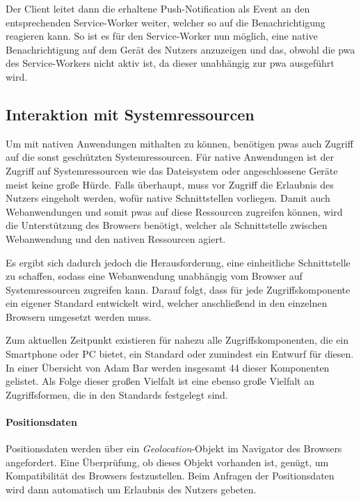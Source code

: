 \documentclass[12pt, parskip=half]{scrartcl}       %
\begin{document}

Der Client leitet dann die erhaltene Push-Notification als Event an den entsprechenden Service-Worker weiter, welcher so auf die Benachrichtigung reagieren kann.
So ist es für den Service-Worker nun möglich, eine native Benachrichtigung auf dem Gerät des Nutzers anzuzeigen und das, obwohl die \ac{pwa} des Service-Workers nicht aktiv ist, da dieser unabhängig zur \ac{pwa} ausgeführt wird.


\subsection{Interaktion mit Systemressourcen}

Um mit nativen Anwendungen mithalten zu können, benötigen \acp{pwa} auch Zugriff auf die sonst geschützten Systemressourcen.
Für native Anwendungen ist der Zugriff auf Systemressourcen wie das Dateisystem oder angeschlossene Geräte meist keine große Hürde.
Falls überhaupt, muss vor Zugriff die Erlaubnis des Nutzers eingeholt werden, wofür native Schnittstellen vorliegen.
Damit auch Webanwendungen und somit \acp{pwa} auf diese Ressourcen zugreifen können, wird die Unterstützung des Browsers benötigt, welcher als Schnittstelle zwischen Webanwendung und den nativen Ressourcen agiert.

Es ergibt sich dadurch jedoch die Herausforderung, eine einheitliche Schnittstelle zu schaffen, sodass eine Webanwendung unabhängig vom Browser auf Systemressourcen zugreifen kann.
Darauf folgt, dass für jede Zugriffskomponente ein eigener Standard entwickelt wird, welcher anschließend in den einzelnen Browsern umgesetzt werden muss.

Zum aktuellen Zeitpunkt existieren für nahezu alle Zugriffskomponenten, die ein Smartphone oder PC bietet, ein Standard oder zumindest ein Entwurf für diesen.
In einer Übersicht von Adam Bar\cite{bar_webcando} werden insgesamt 44 dieser Komponenten gelistet.
Als Folge dieser großen Vielfalt ist eine ebenso große Vielfalt an Zugriffsformen, die in den Standards festgelegt sind.

\paragraph{Positionsdaten} Positionsdaten werden über ein \textit{Geolocation}-Objekt im Navigator des Browsers angefordert.
Eine Überprüfung, ob dieses Objekt vorhanden ist, genügt, um Kompatibilität des Browsers festzustellen.
Beim Anfragen der Positionsdaten wird dann automatisch um Erlaubnis des Nutzers gebeten\cite{w3c_geolocation}.
\end{document}
